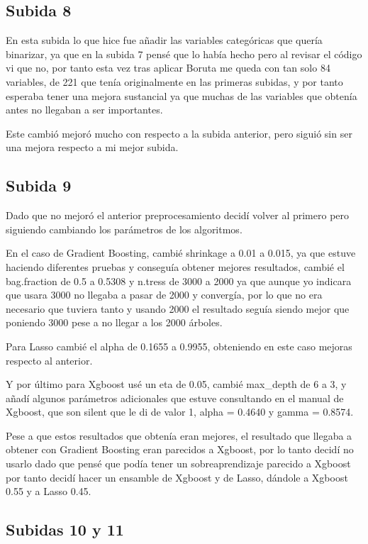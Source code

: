 \documentclass[14pt]{extarticle}
\begin{document}
\subsection{Subida 8}

En esta subida lo que hice fue añadir las variables categóricas que quería binarizar, ya que en la subida 7 pensé que lo había hecho pero al revisar el código vi que no, por tanto esta vez tras aplicar Boruta me queda con tan solo 84 variables, de 221 que tenía originalmente en las primeras subidas, y por tanto esperaba tener una mejora sustancial ya que muchas de las variables que obtenía antes no llegaban a ser importantes.

Este cambió mejoró mucho con respecto a la subida anterior, pero siguió sin ser una mejora respecto a mi mejor subida.

\subsection{Subida 9}

Dado que no mejoró el anterior preprocesamiento decidí volver al primero pero siguiendo cambiando los parámetros de los algoritmos.

En el caso de Gradient Boosting, cambié shrinkage a 0.01 a 0.015, ya que estuve haciendo diferentes pruebas y conseguía obtener mejores resultados, cambié el bag.fraction de 0.5 a 0.5308 y n.tress de 3000 a 2000 ya que aunque yo indicara que usara 3000 no llegaba a pasar de 2000 y convergía, por lo que no era necesario que tuviera tanto y usando 2000 el resultado seguía siendo mejor que poniendo 3000 pese a no llegar a los 2000 árboles.

Para Lasso cambié el alpha de 0.1655 a 0.9955, obteniendo en este caso mejoras respecto al anterior.

Y por último para Xgboost usé un eta de 0.05, cambié max\_depth de 6 a 3, y añadí algunos parámetros adicionales que estuve consultando en el manual de Xgboost, que son silent que le di de valor 1, alpha = 0.4640 y gamma = 0.8574.


Pese a que estos resultados que obtenía eran mejores, el resultado que llegaba a obtener con Gradient Boosting eran parecidos a Xgboost, por lo tanto decidí no usarlo dado que pensé que podía tener un sobreaprendizaje parecido a Xgboost por tanto decidí hacer un ensamble de Xgboost y de Lasso, dándole a Xgboost 0.55 y a Lasso 0.45.

\subsection{Subidas 10 y 11}
\end{document}
